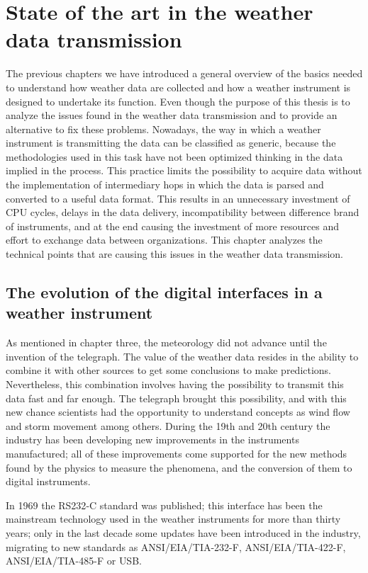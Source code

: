 
\chapter{State of the art in the weather data transmission}\label{chapter4}

The previous chapters we have introduced a general overview of the basics needed to understand how weather data are collected and how a weather instrument is designed to undertake its function. Even though the purpose of this thesis is to analyze the issues found in the weather data transmission and to provide an alternative to fix these problems. Nowadays, the way in which a weather instrument is transmitting the data can be classified as generic, because the methodologies used in this task have not been optimized thinking in the data implied in the process. This practice limits the possibility to acquire data without the implementation of intermediary hops in which the data is parsed and converted to a useful data format. This results in an unnecessary investment  of CPU cycles, delays in the data delivery, incompatibility between difference brand of instruments, and at the end causing the investment of more resources and effort to exchange data between organizations. This chapter analyzes the technical points that are causing this issues in the weather data transmission.

\section{The evolution of the digital interfaces in a  \\ weather instrument}

As mentioned in chapter three, the meteorology did not advance until the invention of the telegraph. The value of the weather data resides in the ability to combine it with other sources to get some conclusions to make predictions. Nevertheless, this combination involves having the possibility to transmit this data fast and far enough. The telegraph brought this possibility, and with this new chance scientists had the opportunity to understand concepts as wind flow and storm movement\cite{METO} among others. During the 19th and 20th century the industry has been developing new improvements in the instruments manufactured; all of these improvements come supported for the new methods found by the physics to measure the phenomena, and the conversion of them to digital instruments. 

In 1969 the \gls{RS232}-C standard was published; this interface has been the mainstream technology used in the weather instruments for more than thirty years; only in the last decade some updates have been introduced in the industry, migrating to new standards as ANSI/EIA/TIA-232-F\cite{RS232S}, ANSI/EIA/TIA-422-F\cite{RS422S}, ANSI/EIA/TIA-485-F\cite{RS485S} or \gls{USB}. 

